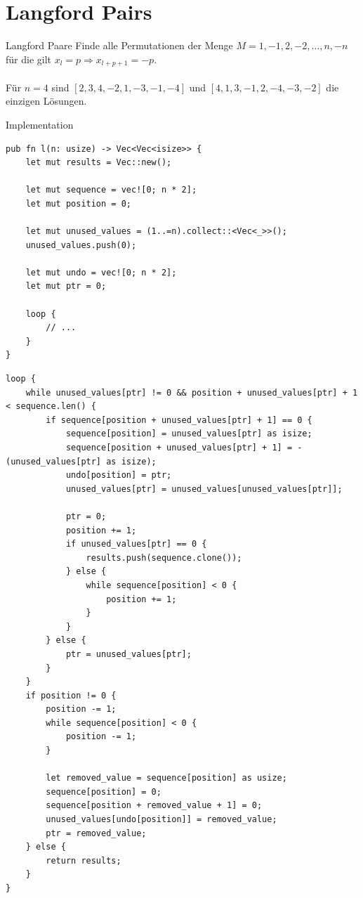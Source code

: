 \documentclass[aspectratio=43,t]{beamer}
\begin{document}
\section{Langford Pairs}
\begin{frame}{Langford Paare}
Finde alle Permutationen der Menge $M = {1, -1, 2, -2, \dots, n, -n}$ für die gilt $x_l = p \Rightarrow x_{l+p+1} = -p$.\\
\ \\
Für $n = 4$ sind $[2, 3, 4, -2, 1, -3, -1, -4]$ und $[4, 1, 3, -1, 2, -4, -3, -2]$ die einzigen Lösungen.
\end{frame}
\begin{frame}[fragile]{Implementation}
  \begin{verbatim}
pub fn l(n: usize) -> Vec<Vec<isize>> {
    let mut results = Vec::new();

    let mut sequence = vec![0; n * 2];
    let mut position = 0;

    let mut unused_values = (1..=n).collect::<Vec<_>>();
    unused_values.push(0);

    let mut undo = vec![0; n * 2];
    let mut ptr = 0;

    loop {
        // ...
    }
}
  \end{verbatim}
\end{frame}
\begin{frame}[fragile]
  \begin{verbatim}
loop {
    while unused_values[ptr] != 0 && position + unused_values[ptr] + 1 < sequence.len() {
        if sequence[position + unused_values[ptr] + 1] == 0 {
            sequence[position] = unused_values[ptr] as isize;
            sequence[position + unused_values[ptr] + 1] = -(unused_values[ptr] as isize);
            undo[position] = ptr;
            unused_values[ptr] = unused_values[unused_values[ptr]];

            ptr = 0;
            position += 1;
            if unused_values[ptr] == 0 {
                results.push(sequence.clone());
            } else {
                while sequence[position] < 0 {
                    position += 1;
                }
            }
        } else {
            ptr = unused_values[ptr];
        }
    }
    if position != 0 {
        position -= 1;
        while sequence[position] < 0 {
            position -= 1;
        }

        let removed_value = sequence[position] as usize;
        sequence[position] = 0;
        sequence[position + removed_value + 1] = 0;
        unused_values[undo[position]] = removed_value;
        ptr = removed_value;
    } else {
        return results;
    }
}
  \end{verbatim}
\end{frame}

\end{document}
